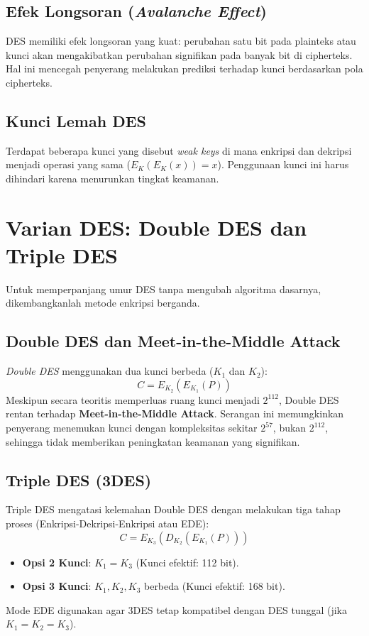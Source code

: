 \documentclass[../main.tex]{subfiles}
\begin{document}
\subsection{Efek Longsoran (\textit{Avalanche Effect})}
DES memiliki efek longsoran yang kuat: perubahan satu bit pada plainteks atau kunci akan mengakibatkan perubahan signifikan pada banyak bit di cipherteks. Hal ini mencegah penyerang melakukan prediksi terhadap kunci berdasarkan pola cipherteks.

\subsection{Kunci Lemah DES}
Terdapat beberapa kunci yang disebut \textit{weak keys} di mana enkripsi dan dekripsi menjadi operasi yang sama ($E_K(E_K(x)) = x$). Penggunaan kunci ini harus dihindari karena menurunkan tingkat keamanan.

\section{Varian DES: Double DES dan Triple DES}
Untuk memperpanjang umur DES tanpa mengubah algoritma dasarnya, dikembangkanlah metode enkripsi berganda.

\subsection{Double DES dan Meet-in-the-Middle Attack}
\textit{Double DES} menggunakan dua kunci berbeda ($K_1$ dan $K_2$):
\[ C = E_{K_2}(E_{K_1}(P)) \]
Meskipun secara teoritis memperluas ruang kunci menjadi $2^{112}$, Double DES rentan terhadap \textbf{Meet-in-the-Middle Attack}. Serangan ini memungkinkan penyerang menemukan kunci dengan kompleksitas sekitar $2^{57}$, bukan $2^{112}$, sehingga tidak memberikan peningkatan keamanan yang signifikan.

\subsection{Triple DES (3DES)}
Triple DES mengatasi kelemahan Double DES dengan melakukan tiga tahap proses (Enkripsi-Dekripsi-Enkripsi atau EDE):
\[ C = E_{K_3}(D_{K_2}(E_{K_1}(P))) \]
\begin{itemize}
    \item \textbf{Opsi 2 Kunci}: $K_1 = K_3$ (Kunci efektif: 112 bit).
    \item \textbf{Opsi 3 Kunci}: $K_1, K_2, K_3$ berbeda (Kunci efektif: 168 bit).
\end{itemize}
Mode EDE digunakan agar 3DES tetap kompatibel dengan DES tunggal (jika $K_1=K_2=K_3$).
\end{document}
